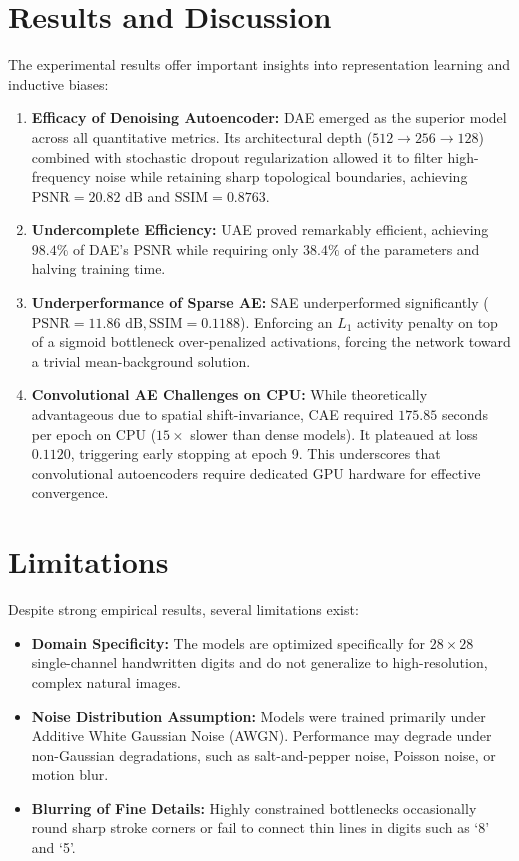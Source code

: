 \documentclass[12pt, a4paper]{article}
\begin{document}
\section{Results and Discussion}

The experimental results offer important insights into representation learning and inductive biases:
\begin{enumerate}[label=\textbf{\arabic*.}]
    \item \textbf{Efficacy of Denoising Autoencoder:} DAE emerged as the superior model across all quantitative metrics. Its architectural depth ($512 \to 256 \to 128$) combined with stochastic dropout regularization allowed it to filter high-frequency noise while retaining sharp topological boundaries, achieving $\text{PSNR} = 20.82\text{ dB}$ and $\text{SSIM} = 0.8763$.
    \item \textbf{Undercomplete Efficiency:} UAE proved remarkably efficient, achieving $98.4\%$ of DAE's PSNR while requiring only $38.4\%$ of the parameters and halving training time.
    \item \textbf{Underperformance of Sparse AE:} SAE underperformed significantly ($\text{PSNR} = 11.86\text{ dB}, \text{SSIM} = 0.1188$). Enforcing an $L_1$ activity penalty on top of a sigmoid bottleneck over-penalized activations, forcing the network toward a trivial mean-background solution.
    \item \textbf{Convolutional AE Challenges on CPU:} While theoretically advantageous due to spatial shift-invariance, CAE required $175.85$ seconds per epoch on CPU ($15\times$ slower than dense models). It plateaued at loss $0.1120$, triggering early stopping at epoch 9. This underscores that convolutional autoencoders require dedicated GPU hardware for effective convergence.
\end{enumerate}


\section{Limitations}

Despite strong empirical results, several limitations exist:
\begin{itemize}[noitemsep]
    \item \textbf{Domain Specificity:} The models are optimized specifically for $28 \times 28$ single-channel handwritten digits and do not generalize to high-resolution, complex natural images.
    \item \textbf{Noise Distribution Assumption:} Models were trained primarily under Additive White Gaussian Noise (AWGN). Performance may degrade under non-Gaussian degradations, such as salt-and-pepper noise, Poisson noise, or motion blur.
    \item \textbf{Blurring of Fine Details:} Highly constrained bottlenecks occasionally round sharp stroke corners or fail to connect thin lines in digits such as `8' and `5'.
\end{itemize}
\end{document}
